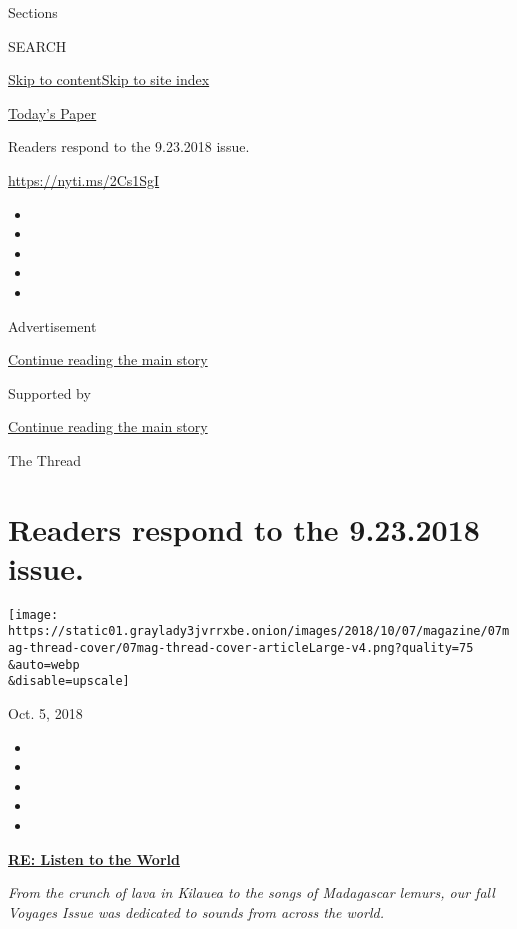 Sections

SEARCH

\protect\hyperlink{site-content}{Skip to
content}\protect\hyperlink{site-index}{Skip to site index}

\href{https://myaccount.nytimes3xbfgragh.onion/auth/login?response_type=cookie\&client_id=vi}{}

\href{https://www.nytimes3xbfgragh.onion/section/todayspaper}{Today's
Paper}

Readers respond to the 9.23.2018 issue.

\url{https://nyti.ms/2Cs1SgI}

\begin{itemize}
\item
\item
\item
\item
\item
\end{itemize}

Advertisement

\protect\hyperlink{after-top}{Continue reading the main story}

Supported by

\protect\hyperlink{after-sponsor}{Continue reading the main story}

The Thread

\hypertarget{readers-respond-to-the-9232018-issue}{%
\section{Readers respond to the 9.23.2018
issue.}\label{readers-respond-to-the-9232018-issue}}

\texttt{[image: https://static01.graylady3jvrrxbe.onion/images/2018/10/07/magazine/07mag-thread-cover/07mag-thread-cover-articleLarge-v4.png?quality=75\\\&auto=webp\\\&disable=upscale]}

Oct. 5, 2018

\begin{itemize}
\item
\item
\item
\item
\item
\end{itemize}

\href{https://www.nytimes3xbfgragh.onion/interactive/2018/09/21/magazine/voyages-travel-sounds-from-the-world.html}{\textbf{RE:
Listen to the World}}

\emph{From the crunch of lava in Kilauea to the songs of Madagascar
lemurs, our fall Voyages Issue was dedicated to sounds from across the
world.}

